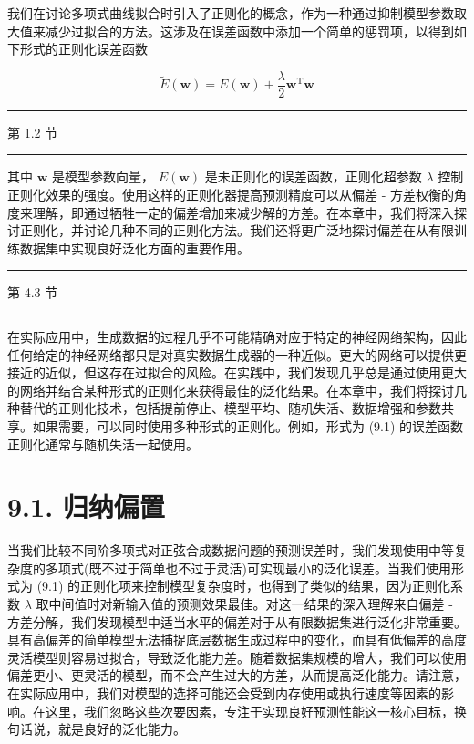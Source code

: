 \documentclass[10pt]{report}
\newcommand{\HRule}{\begin{center}\rule{0.9\linewidth}{0.2mm}\end{center}}
\begin{document}
我们在讨论多项式曲线拟合时引入了正则化的概念，作为一种通过抑制模型参数取大值来减少过拟合的方法。这涉及在误差函数中添加一个简单的惩罚项，以得到如下形式的正则化误差函数

\[
\widetilde{E}\left( \mathbf{w}\right)  = E\left( \mathbf{w}\right)  + \frac{\lambda }{2}{\mathbf{w}}^{\mathrm{T}}\mathbf{w} \tag{9.1}
\]

\HRule

第 1.2 节

\HRule

其中 \(\mathbf{w}\) 是模型参数向量， \(E\left( \mathbf{w}\right)\) 是未正则化的误差函数，正则化超参数 \(\lambda\) 控制正则化效果的强度。使用这样的正则化器提高预测精度可以从偏差 - 方差权衡的角度来理解，即通过牺牲一定的偏差增加来减少解的方差。在本章中，我们将深入探讨正则化，并讨论几种不同的正则化方法。我们还将更广泛地探讨偏差在从有限训练数据集中实现良好泛化方面的重要作用。

\HRule

第 4.3 节

\HRule

在实际应用中，生成数据的过程几乎不可能精确对应于特定的神经网络架构，因此任何给定的神经网络都只是对真实数据生成器的一种近似。更大的网络可以提供更接近的近似，但这存在过拟合的风险。在实践中，我们发现几乎总是通过使用更大的网络并结合某种形式的正则化来获得最佳的泛化结果。在本章中，我们将探讨几种替代的正则化技术，包括提前停止、模型平均、随机失活、数据增强和参数共享。如果需要，可以同时使用多种形式的正则化。例如，形式为 (9.1) 的误差函数正则化通常与随机失活一起使用。

\section*{9.1. 归纳偏置}

当我们比较不同阶多项式对正弦合成数据问题的预测误差时，我们发现使用中等复杂度的多项式(既不过于简单也不过于灵活)可实现最小的泛化误差。当我们使用形式为 (9.1) 的正则化项来控制模型复杂度时，也得到了类似的结果，因为正则化系数 \(\lambda\) 取中间值时对新输入值的预测效果最佳。对这一结果的深入理解来自偏差 - 方差分解，我们发现模型中适当水平的偏差对于从有限数据集进行泛化非常重要。具有高偏差的简单模型无法捕捉底层数据生成过程中的变化，而具有低偏差的高度灵活模型则容易过拟合，导致泛化能力差。随着数据集规模的增大，我们可以使用偏差更小、更灵活的模型，而不会产生过大的方差，从而提高泛化能力。请注意，在实际应用中，我们对模型的选择可能还会受到内存使用或执行速度等因素的影响。在这里，我们忽略这些次要因素，专注于实现良好预测性能这一核心目标，换句话说，就是良好的泛化能力。
\end{document}
